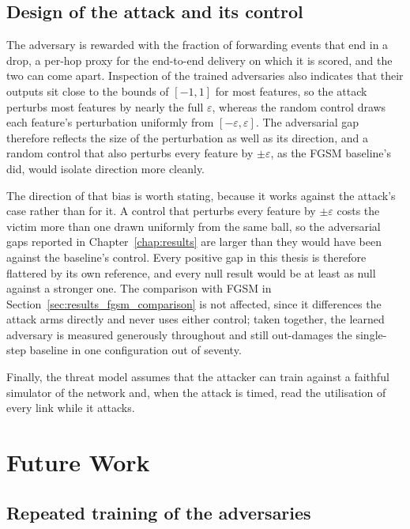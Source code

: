 \subsection{Design of the attack and its control}
\label{subsec:limitations_design}

The adversary is rewarded with the fraction of forwarding events that end in a drop, a
per-hop proxy for the end-to-end delivery on which it is scored, and the two can come
apart. Inspection of the trained adversaries also indicates that their outputs sit close
to the bounds of $[-1,1]$ for most features, so the attack perturbs most features by
nearly the full $\varepsilon$, whereas the random control draws each feature's
perturbation uniformly from $[-\varepsilon, \varepsilon]$. The adversarial gap therefore
reflects the size of the perturbation as well as its direction, and a random control
that also perturbs every feature by $\pm\varepsilon$, as the FGSM baseline's did, would
isolate direction more cleanly.

The direction of that bias is worth stating, because it works against the attack's
case rather than for it. A control that perturbs every feature by $\pm\varepsilon$ costs
the victim more than one drawn uniformly from the same ball, so the adversarial gaps
reported in Chapter~\ref{chap:results} are larger than they would have been against the
baseline's control. Every positive gap in this thesis is therefore flattered by its own
reference, and every null result would be at least as null against a stronger one. The
comparison with FGSM in Section~\ref{sec:results_fgsm_comparison} is not affected, since
it differences the attack arms directly and never uses either control; taken together,
the learned adversary is measured generously throughout and still out-damages the
single-step baseline in one configuration out of seventy.

Finally, the threat model assumes that the attacker can
train against a faithful simulator of the network and, when the attack is timed, read
the utilisation of every link while it attacks.

\section{Future Work}
\label{sec:future_work}

\subsection{Repeated training of the adversaries}
\label{subsec:future_repetition}

